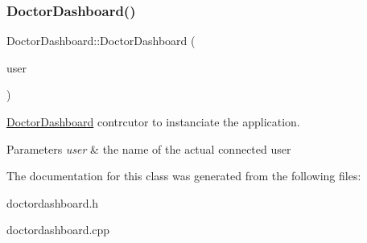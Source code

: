 \subsubsection{\texorpdfstring{DoctorDashboard()}{DoctorDashboard()}}
{\footnotesize\ttfamily Doctor\+Dashboard\+::\+Doctor\+Dashboard (\begin{DoxyParamCaption}\item[{Q\+String}]{user }\end{DoxyParamCaption})\hspace{0.3cm}{\ttfamily [explicit]}}



\mbox{\hyperlink{class_doctor_dashboard}{Doctor\+Dashboard}} contrcutor to instanciate the application. 


\begin{DoxyParams}{Parameters}
{\em user} & the name of the actual connected user \\
\hline
\end{DoxyParams}


The documentation for this class was generated from the following files\+:\begin{DoxyCompactItemize}
\item 
doctordashboard.\+h\item 
doctordashboard.\+cpp\end{DoxyCompactItemize}
